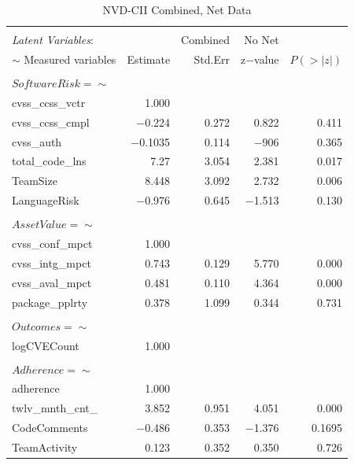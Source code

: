 \begin{table}
	\begin{center}	
		\caption{NVD-CII Combined, Net Data}
		\label{tab:results_combined2}
		\begin{tabular}{l|rrrr}
			\\[-1.8ex]\hline 
			\hline \\[-1.8ex] 
			\textit{Latent Variables}: &  & Combined & No Net & \\  
			$\sim$ Measured variables& Estimate & Std.Err & z$-$value & $P(>|z|)$ \\
			\hline \\[-1.8ex]
			$SoftwareRisk =\sim$  & & & & \\                                   
			cvss\_ccss\_vctr   & 1.000 & &  & \\                             
			cvss\_ccss\_cmpl &  $-$0.224 &   0.272 & 0.822 &   0.411\\
			cvss\_auth     &   $-$0.1035  &  0.114  & $-$906   & 0.365\\
			total\_code\_lns  &  7.27 &   3.054 &   2.381 &   0.017\\
			TeamSize        &  8.448   & 3.092  & 2.732   & 0.006\\
			LanguageRisk    &  $-$0.976  &  0.645   & $-$1.513   & 0.130\\ 
			& & & & \\  
			$AssetValue =\sim$     & & & & \\                                    		
			cvss\_conf\_mpct  &  1.000  &	&	&                  \\
			cvss\_intg\_mpct  &  0.743  &  0.129 &   5.770  &  0.000\\
			cvss\_aval\_mpct  &  0.481 &   0.110 &   4.364 &   0.000\\
			package\_pplrty  &  0.378 &   1.099  &  0.344 &   0.731\\	
			& & & & \\  
			$Outcomes =\sim$    & & & & \\                                     
			logCVECount     &  1.000  & & & \\                          
			& & & & \\  
			$Adherence =\sim$   & & & & \\                                      
			adherence    &     1.000        & & & \\    
			twlv\_mnth\_cnt\_  &  3.852  &  0.951  &  4.051 &   0.000\\
			CodeComments    &  $-$0.486  &  0.353  &  $-$1.376  &  0.1695\\
			TeamActivity    &  0.123  &  0.352 &   0.350 &   0.726\\	
			

\end{tabular}
\end{center}
\end{table}
